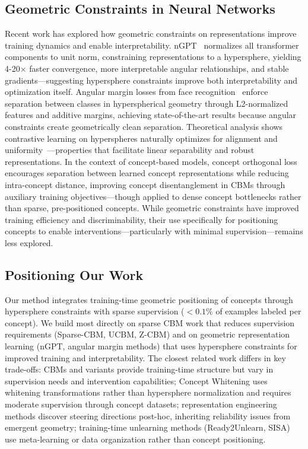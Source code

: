 \subsection{Geometric Constraints in Neural Networks}

Recent work has explored how geometric constraints on representations improve training dynamics and enable interpretability. nGPT~\citep{loshchilov2025ngptnormalizedtransformerrepresentation} normalizes all transformer components to unit norm, constraining representations to a hypersphere, yielding 4-20× faster convergence, more interpretable angular relationships, and stable gradients---suggesting hypersphere constraints improve both interpretability and optimization itself. Angular margin losses from face recognition~\citep{liu2018spherefacedeephypersphereembedding,Deng_2022} enforce separation between classes in hyperspherical geometry through L2-normalized features and additive margins, achieving state-of-the-art results because angular constraints create geometrically clean separation. Theoretical analysis shows contrastive learning on hyperspheres naturally optimizes for alignment and uniformity~\citep{wang2022understandingcontrastiverepresentationlearning}---properties that facilitate linear separability and robust representations. In the context of concept-based models, concept orthogonal loss~\citep{Sheth2023AuxiliaryLF} encourages separation between learned concept representations while reducing intra-concept distance, improving concept disentanglement in CBMs through auxiliary training objectives---though applied to dense concept bottlenecks rather than sparse, pre-positioned concepts. While geometric constraints have improved training efficiency and discriminability, their use specifically for positioning concepts to enable interventions---particularly with minimal supervision---remains less explored.

\subsection{Positioning Our Work}

Our method integrates training-time geometric positioning of concepts through hypersphere constraints with sparse supervision ($<0.1\%$ of examples labeled per concept). We build most directly on sparse CBM work that reduces supervision requirements (Sparse-CBM, UCBM, Z-CBM) and on geometric representation learning (nGPT, angular margin methods) that uses hypersphere constraints for improved training and interpretability. The closest related work differs in key trade-offs: CBMs and variants provide training-time structure but vary in supervision needs and intervention capabilities; Concept Whitening uses whitening transformations rather than hypersphere normalization and requires moderate supervision through concept datasets; representation engineering methods discover steering directions post-hoc, inheriting reliability issues from emergent geometry; training-time unlearning methods (Ready2Unlearn, SISA) use meta-learning or data organization rather than concept positioning.

